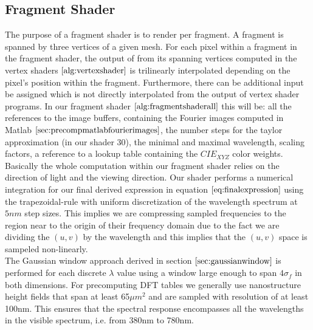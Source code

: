 \subsection{Fragment Shader}
\label{sec:fragmentshader}
The purpose of a fragment shader is to render per fragment. A fragment is spanned by three vertices of a given mesh. For each pixel within a fragment in the fragment shader, the output of from its spanning vertices computed in the vertex shaders $\ref{alg:vertexshader}$ is trilinearly interpolated depending on the pixel's position within the fragment. Furthermore, there can be additional input be assigned which is not directly interpolated from the output of vertex shader programs. In our fragment shader $\ref{alg:fragmentshaderall}$ this will be: all the references to the image buffers, containing the Fourier images computed in Matlab $\ref{sec:precompmatlabfourierimages}$, the number steps for the taylor approximation (in our shader 30), the minimal and maximal wavelength, scaling factors, a reference to a lookup table containing the $CIE_{XYZ}$ color weights. Basically the whole computation within our fragment shader relies on the direction of light and the viewing direction. Our shader performs a numerical integration for our final derived expression in equation $\ref{eq:finalexpression}$ using the trapezoidal-rule with uniform discretization of the wavelength spectrum at $5nm$ step sizes. This implies we are compressing sampled frequencies to the region near to the origin of their frequency domain due to the fact we are dividing the $(u,v)$ by the wavelength and this implies that the $(u,v)$ space is sampeled non-linearly. \\

The Gaussian window approach derived in section $\ref{sec:gaussianwindow}$ is performed for each discrete $\lambda$ value using a window large enough to span $4\sigma_f$ in both dimensions. For precomputing DFT tables we generally use nanostructure height fields that span at least 65$\mu m^2$ and are sampled with resolution of at least 100nm. This ensures that the spectral response encompasses all the wavelengths in the visible spectrum, i.e. from 380nm to 780nm.

